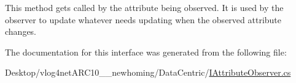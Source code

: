 This method gets called by the attribute being observed. It is used by the observer to update whatever needs updating when the observed attribute changes. 



The documentation for this interface was generated from the following file\-:\begin{DoxyCompactItemize}
\item 
Desktop/vlog4net\-A\-R\-C10\-\_\-\_\-newhoming/\-Data\-Centric/\hyperlink{_i_attribute_observer_8cs}{I\-Attribute\-Observer.\-cs}\end{DoxyCompactItemize}
